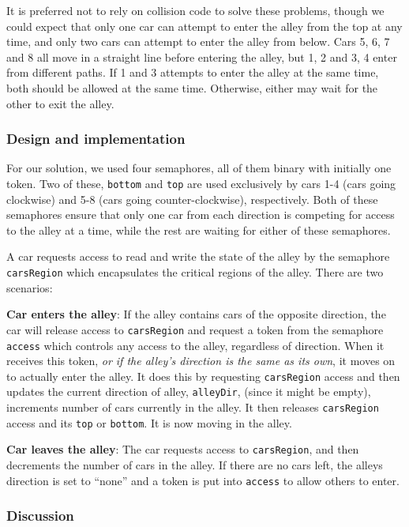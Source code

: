 It is preferred not to rely on collision code to solve these problems, though we could expect that only one car can attempt to enter the alley from the top at any time, and only two cars can attempt to enter the alley from below. Cars 5, 6, 7 and 8 all move in a straight line before entering the alley, but 1, 2 and 3, 4 enter from different paths. If 1 and 3 attempts to enter the alley at the same time, both should be allowed at the same time. Otherwise, either may wait for the other to exit the alley.

\subsubsection*{Design and implementation}
For our solution, we used four semaphores, all of them binary with initially one token. Two of these, \texttt{bottom} and \texttt{top} are used exclusively by cars 1-4 (cars going clockwise) and 5-8 (cars going counter-clockwise), respectively. Both of these semaphores ensure that only one car from each direction is competing for access to the alley at a time, while the rest are waiting for either of these semaphores.

A car requests access to read and write the state of the alley by the semaphore \texttt{carsRegion} which encapsulates the critical regions of the alley. There are two scenarios:

\textbf{Car enters the alley}: If the alley contains cars of the opposite direction, the car will release access to \texttt{carsRegion} and request a token from the semaphore \texttt{access} which controls any access to the alley, regardless of direction. When it receives this token, \emph{or if the alley's direction is the same as its own}, it moves on to actually enter the alley. It does this by requesting \texttt{carsRegion} access and then updates the current direction of alley, \texttt{alleyDir}, (since it might be empty), increments number of cars currently in the alley. It then releases \texttt{carsRegion} access and its \texttt{top} or \texttt{bottom}. It is now moving in the alley.

\textbf{Car leaves the alley}: The car requests access to \texttt{carsRegion}, and then decrements the number of cars in the alley. If there are no cars left, the alleys direction is set to ``none'' and a token is put into \texttt{access} to allow others to enter.

\subsubsection*{Discussion}


